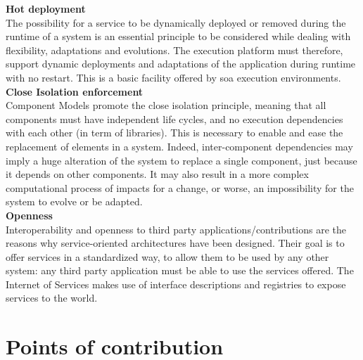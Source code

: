 {\bf Hot deployment}\\
The possibility for a service to be dynamically deployed or removed during the runtime of a system is an essential principle to be considered while dealing with flexibility, adaptations and evolutions. The execution platform must therefore, support dynamic deployments and adaptations of the application during runtime with no restart. This is a basic facility offered by \gls{soa} execution environments.\\

{\bf Close Isolation enforcement}\\
Component Models promote the close isolation principle, meaning that all components must have independent life cycles, and no execution dependencies with each other (in term of libraries). This is necessary to enable and ease the replacement of elements in a system. Indeed, inter-component dependencies may imply a huge alteration of the system to replace a single component, just because it depends on other components. It may also result in a more complex computational process of impacts for a change, or worse, an impossibility for the system to evolve or be adapted.\\

{\bf Openness}\\
Interoperability and openness to third party applications/contributions are the reasons why service-oriented architectures have been designed. Their goal is to offer services in a standardized way, to allow them to be used by any other system: any third party application must be able to use the services offered. The Internet of Services makes use of interface descriptions and registries to expose services to the world.


\section{Points of contribution}

